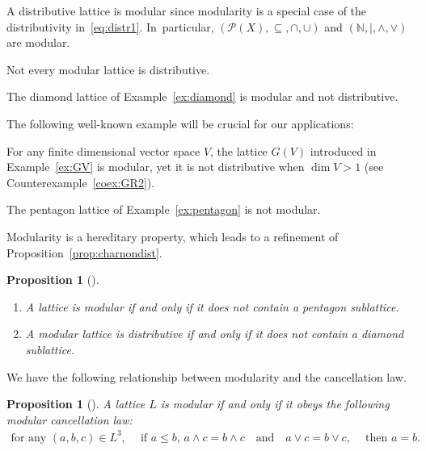 \documentclass[10pt,a4paper]{amsart}
\numberwithin{equation}{section}
\newtheorem{Proposition}[Theorem]{Proposition}
\newcommand{\N}{\mathbb{N}}
\begin{document}
\begin{Example}
A distributive lattice is modular since modularity is a special case of the distributivity in~\eqref{eq:distr1}. In~particular,
$({\mathcal P}(X), \subseteq, \cap, \cup)$ and $(\N, \vert, \wedge, \vee)$ are modular.
	\end{Example}

Not every modular lattice is distributive.

\begin{Example}
The diamond lattice of Example~\ref{ex:diamond} is modular and not distributive.
\end{Example}
	
	The following well-known example will be crucial for our applications:
	\begin{Example}\label{ex:GVmodularity}
		For any finite dimensional vector space $V$, the \subsp lattice $G(V)$ introduced in Example~\ref{ex:GV} is modular, yet it is not distributive when $\dim V>1$ (see
		Counterexample~\ref{coex:GR2}).
	\end{Example}
\begin{coex}
The pentagon lattice of Example~\ref{ex:pentagon} is not modular.
	\end{coex}

Modularity is a hereditary property, which leads to a refinement of Proposition~\ref{prop:charnondist}.

\begin{Proposition}[{\cite[Theorems~101 and 102]{Gra1}}]%
\qquad
\begin{enumerate}\itemsep=0pt
\item[$(a)$]
A lattice is modular if and only if it does not contain a pentagon sublattice.
\item[$(b)$]
A modular lattice is distributive if and only if it does not contain a diamond sublattice.
\end{enumerate}
\end{Proposition}

We have the following relationship between modularity and the cancellation law.
\begin{Proposition}[{\cite[Corollary~2.1.1]{PR}}]
A lattice $L$ is modular if and only if it obeys the following {\it modular cancellation law}:
\begin{gather*}
\text{for any } (a, b, c)\in L^3, \quad\ \text{if } a\leq b,\, a\wedge c=b\wedge c\quad \text{and}\quad a\vee c=b\vee c,\quad\ \text{then } a=b.
	\end{gather*}
\end{Proposition}
\end{document}
